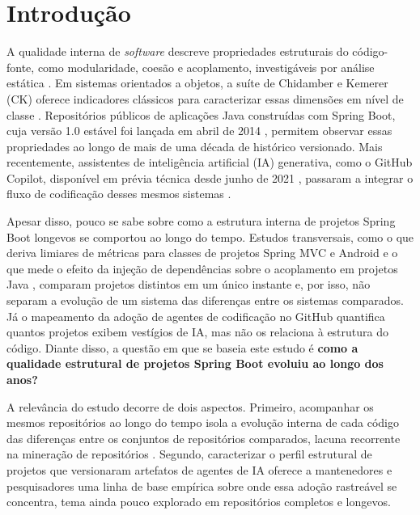 \section{Introdução}
\label{sec:introducao}

A qualidade interna de \emph{software} descreve propriedades estruturais do código-fonte, como modularidade, coesão e acoplamento, investigáveis por análise estática \cite{iso25010,pressman:21}. Em sistemas orientados a objetos, a suíte de Chidamber e Kemerer (CK) oferece indicadores clássicos para caracterizar essas dimensões em nível de classe \cite{chidamber:94}. Repositórios públicos de aplicações Java construídas com Spring Boot, cuja versão 1.0 estável foi lançada em abril de 2014 \cite{springboot:2014}, permitem observar essas propriedades ao longo de mais de uma década de histórico versionado. Mais recentemente, assistentes de inteligência artificial (IA) generativa, como o GitHub Copilot, disponível em prévia técnica desde junho de 2021 \cite{copilot:2021}, passaram a integrar o fluxo de codificação desses mesmos sistemas \cite{hou:2024:llm}.

Apesar disso, pouco se sabe sobre como a estrutura interna de projetos Spring Boot longevos se comportou ao longo do tempo. Estudos transversais, como o que deriva limiares de métricas para classes de projetos Spring MVC e Android \cite{aniche:16} e o que mede o efeito da injeção de dependências sobre o acoplamento em projetos Java \cite{sun:22}, comparam projetos distintos em um único instante e, por isso, não separam a evolução de um sistema das diferenças entre os sistemas comparados. Já o mapeamento da adoção de agentes de codificação no GitHub \cite{robbes:26} quantifica quantos projetos exibem vestígios de IA, mas não os relaciona à estrutura do código. Diante disso, a questão em que se baseia este estudo é \textbf{como a qualidade estrutural de projetos Spring Boot evoluiu ao longo dos anos?}

A relevância do estudo decorre de dois aspectos. Primeiro, acompanhar os mesmos repositórios ao longo do tempo isola a evolução interna de cada código das diferenças entre os conjuntos de repositórios comparados, lacuna recorrente na mineração de repositórios \cite{hassan:08,kalliamvakou:16}. Segundo, caracterizar o perfil estrutural de projetos que versionaram artefatos de agentes de IA oferece a mantenedores e pesquisadores uma linha de base empírica sobre onde essa adoção rastreável se concentra, tema ainda pouco explorado em repositórios completos e longevos.

